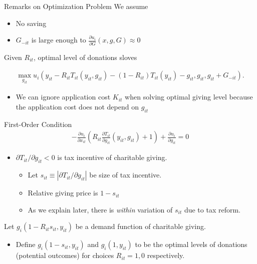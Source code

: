 \documentclass[
  ignorenonframetext,
  aspectratio=169,
]{beamer}
\providecommand{\tightlist}{%
  \setlength{\itemsep}{0pt}\setlength{\parskip}{0pt}}
\begin{document}
\begin{frame}{Remarks on Optimization Problem}
\protect\hypertarget{remarks-on-optimization-problem}{}
We assume

\begin{itemize}
\tightlist
\item
  No saving
\item
  \(G_{-it}\) is large enough to \(\frac{\partial u_i}{\partial G}(x, g, G) \approx 0\)
\end{itemize}

Given \(R_{it}\), optimal level of donations sloves

\begin{align}
  \max_{g_{it}} u_i(
    y_{it} - R_{it} T_{it}(y_{it}, g_{it}) - (1 - R_{it}) T_{it}(y_{it}) - g_{it}, g_{it}, g_{it} + G_{-it}
  ).
\end{align}

\begin{itemize}
\tightlist
\item
  We can ignore application cost \(K_{it}\) when solving optimal giving level because the application cost does not depend on \(g_{it}\)
\end{itemize}
\end{frame}

\begin{frame}{First-Order Condition}
\protect\hypertarget{first-order-condition}{}
\begin{align}
  - \frac{\partial u_i}{\partial x_{it}}
  \left( R_{it} \frac{\partial T_{it}}{\partial g_{it}}(y_{it}, g_{it}) + 1 \right)
  + \frac{\partial u_i}{\partial g_{it}} = 0
\end{align}

\begin{itemize}
\tightlist
\item
  \(\partial T_{it} / \partial g_{it} < 0\) is tax incentive of charitable giving.

  \begin{itemize}
  \tightlist
  \item
    Let \(s_{it} \equiv |\partial T_{it} / \partial g_{it}|\) be size of tax incentive.
  \item
    Relative giving price is \(1 - s_{it}\)
  \item
    As we explain later, there is \emph{within} variation of \(s_{it}\) due to tax reform.
  \end{itemize}
\end{itemize}

Let \(g_i(1 - R_{it} s_{it}, y_{it})\) be a demand function of charitable giving.

\begin{itemize}
\tightlist
\item
  Define \(g_i(1 - s_{it}, y_{it})\) and \(g_i(1, y_{it})\) to be the optimal levels of donations (potential outcomes) for choices \(R_{it} = 1, 0\) respectively.
\end{itemize}
\end{frame}
\end{document}
